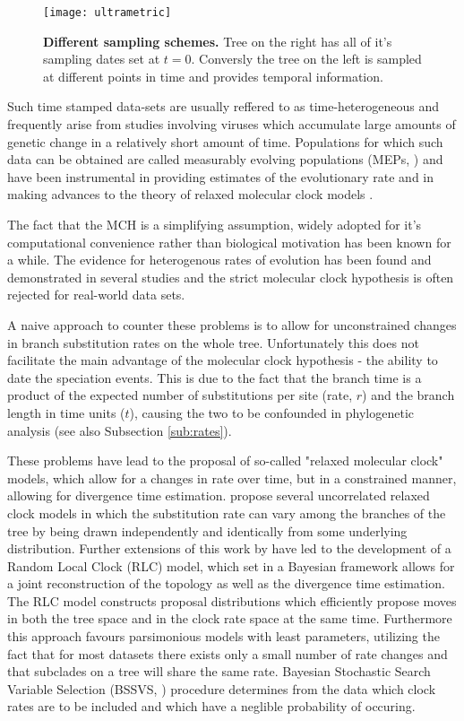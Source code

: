 \begin{figure}[H]
\centering
\texttt{[image: ultrametric]} 
\caption{
{ \footnotesize 
{\bf Different sampling schemes.} Tree on the right has all of it's sampling dates set at $t=0$. Conversly the tree on the left is sampled at different points in time and provides temporal information.
}%
}
\label{fig:ultrametric}
\end{figure}

Such time stamped data-sets are usually reffered to as time-heterogeneous and frequently arise from studies involving viruses which accumulate large amounts of genetic change in a relatively short amount of time.
Populations for which such data can be obtained are called measurably evolving populations (MEPs, \cite{Drummond2003}) and have been instrumental in providing estimates of the evolutionary rate and in making advances to the theory of relaxed molecular clock models \citep{Drummond2006}.

The fact that the MCH is a simplifying assumption, widely adopted for it's computational convenience rather than biological motivation has been known for a while.
The evidence for heterogenous rates of evolution has been found and demonstrated in several studies \citep{EyreWalker1997,Andreasen2001} and the strict molecular clock hypothesis is often rejected for real-world data sets.

A naive approach to counter these problems is to allow for unconstrained changes in branch substitution rates on the whole tree.
Unfortunately this does not facilitate the main advantage of the molecular clock hypothesis - the ability to date the speciation events.
This is due to the fact that the branch time is a product of the expected number of substitutions per site (rate, $r$) and the branch length in time units ($t$), causing the two to be confounded in phylogenetic analysis (see also Subsection \ref{sub:rates}).

These problems have lead to the proposal of so-called "relaxed molecular clock" models, which allow for a changes in rate over time, but in a constrained manner, allowing for divergence time estimation.
\citet{Drummond2006} propose several uncorrelated relaxed clock models in which the substitution rate can vary among the branches of the tree by being drawn independently and identically from some underlying distribution.
Further extensions of this work by \citet{Drummond2010} have led to the development of a Random Local Clock (RLC) model, which set in a Bayesian framework allows for a joint reconstruction of the topology as well as the divergence time estimation. 
The RLC model constructs proposal distributions which efficiently propose moves in both the tree space and in the clock rate space at the same time. %
Furthermore this approach favours parsimonious models with least parameters, utilizing the fact that for most datasets there exists only a small number of rate changes and that subclades on a tree will share the same rate.
Bayesian Stochastic Search Variable Selection (BSSVS, \citet{Lemey2009}) procedure determines from the data which clock rates are to be included and which have a neglible probability of occuring.


